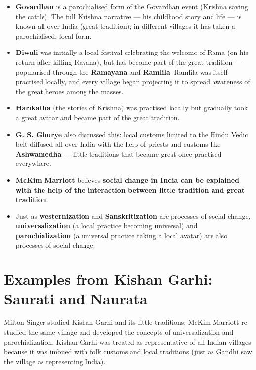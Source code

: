 \begin{ExampleBox}
\begin{itemize}
\item \textbf{Govardhan} is a parochialised form of the Govardhan event (Krishna saving the cattle). The full Krishna narrative --- his childhood story and life --- is known all over India (great tradition); in different villages it has taken a parochialised, local form.
\item \textbf{Diwali} was initially a local festival celebrating the welcome of Rama (on his return after killing Ravana), but has become part of the great tradition --- popularised through the \textbf{Ramayana} and \textbf{Ramlila}. Ramlila was itself practised locally, and every village began projecting it to spread awareness of the great heroes among the masses.
\item \textbf{Harikatha} (the stories of Krishna) was practised locally but gradually took a great avatar and became part of the great tradition.
\item \textbf{G. S. Ghurye} also discussed this: local customs limited to the Hindu Vedic belt diffused all over India with the help of priests and customs like \textbf{Ashwamedha} --- little traditions that became great once practised everywhere.
\end{itemize}
\end{ExampleBox}

\begin{KeyConcept}
\begin{itemize}
\item \textbf{McKim Marriott} believes \textbf{social change in India can be explained with the help of the interaction between little tradition and great tradition}.
\item Just as \textbf{westernization} and \textbf{Sanskritization} are processes of social change, \textbf{universalization} (a local practice becoming universal) and \textbf{parochialization} (a universal practice taking a local avatar) are also processes of social change.
\end{itemize}
\end{KeyConcept}

\section{Examples from Kishan Garhi: Saurati and Naurata}

Milton Singer studied Kishan Garhi and its little traditions; McKim Marriott re-studied the same village and developed the concepts of universalization and parochialization. Kishan Garhi was treated as representative of all Indian villages because it was imbued with folk customs and local traditions (just as Gandhi saw the village as representing India).

